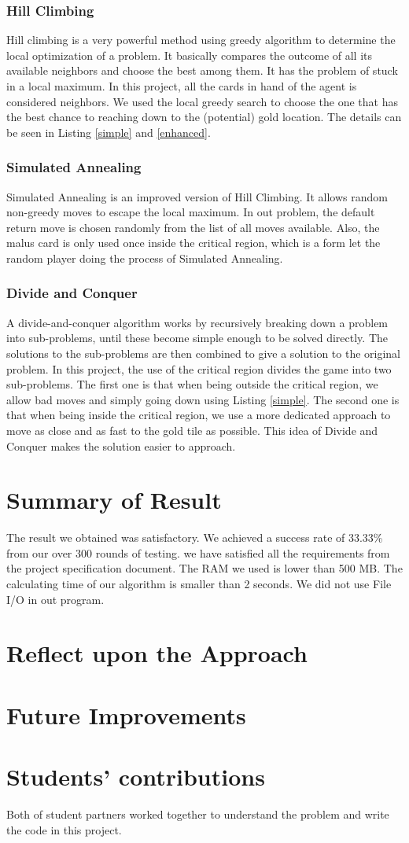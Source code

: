 \documentclass[12pt,twoside,letterpaper]{article}
\begin{document}
\subsubsection{Hill Climbing}
 Hill climbing is a very powerful method using greedy algorithm to determine the local optimization of a problem. It basically compares the outcome of all its available neighbors and choose the best among them. It has the problem of stuck in a local maximum. In this project, all the cards in hand of the agent is considered neighbors. We used the local greedy search to choose the one that has the best chance to reaching down to the (potential) gold location. The details can be seen in Listing \ref{simple} and \ref{enhanced}.
\subsubsection{Simulated Annealing}
Simulated Annealing is an improved version of Hill Climbing. It allows random non-greedy moves to escape the local maximum. In out problem, the default return move is chosen randomly from the list of all moves available. Also, the malus card is only used once inside the critical region, which is a form let the random player doing the process of Simulated Annealing.
\subsubsection{Divide and Conquer}
A divide-and-conquer algorithm works by recursively breaking down a problem into sub-problems, until these become simple enough to be solved directly. The solutions to the sub-problems are then combined to give a solution to the original problem. In this project, the use of the critical region divides the game into two sub-problems. The first one is that when being outside the critical region, we allow bad moves and simply going down using Listing \ref{simple}. The second one is that when being inside the critical region, we use a more dedicated approach to move as close and as fast to the gold tile as possible. This idea of Divide and Conquer makes the solution easier to approach.

\section{Summary of Result}
The result we obtained was satisfactory. We achieved a success rate of 33.33\% from our over 300 rounds of testing. we have satisfied all the requirements from the project specification document. The RAM we used is lower than 500 MB. The calculating time of our algorithm is smaller than 2 seconds. We did not use File I/O in out program.
\clearpage

\section{Reflect upon the Approach}
\lipsum
\clearpage

\section{Future Improvements}
\lipsum
\vfill
\section*{Students' contributions}
Both of student partners worked together to understand the problem and write the code in this project.
\end{document}
